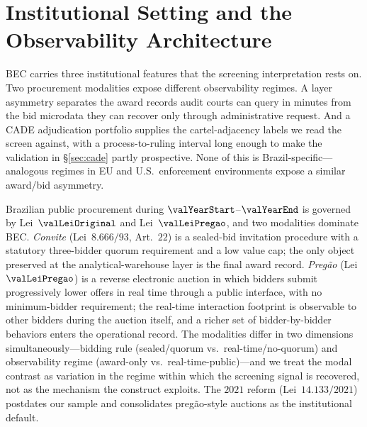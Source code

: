 \section{Institutional Setting and the Observability Architecture}
\label{sec:institutional}

BEC carries three institutional features that the screening
interpretation rests on. Two procurement modalities expose
different observability regimes. A layer asymmetry separates
the award records audit courts can query in minutes from the
bid microdata they can recover only through administrative
request. And a CADE adjudication portfolio supplies the
cartel-adjacency labels we read the screen against, with a
process-to-ruling interval long enough to make the validation
in \S\ref{sec:cade} partly prospective. None of this is
Brazil-specific---analogous regimes in EU and U.S.\ enforcement
environments expose a similar award/bid asymmetry.

Brazilian public procurement during $\valYearStart$--$\valYearEnd$
is governed by Lei~$\valLeiOriginal$ and Lei~$\valLeiPregao$,
and two modalities dominate BEC. \emph{Convite}
(Lei~$8.666/93$, Art.~$22$) is a sealed-bid invitation procedure
with a statutory three-bidder quorum requirement and a low value
cap; the only object preserved at the analytical-warehouse layer
is the final award record. \emph{Preg\~ao}
(Lei~$\valLeiPregao$) is a reverse electronic auction in which
bidders submit progressively lower offers in real time through a
public interface, with no minimum-bidder requirement; the
real-time interaction footprint is observable to other bidders
during the auction itself, and a richer set of bidder-by-bidder
behaviors enters the operational record. The modalities differ
in two dimensions simultaneously---bidding rule (sealed/quorum
vs.\ real-time/no-quorum) and observability regime (award-only
vs.\ real-time-public)---and we treat the modal contrast as
variation in the regime within which the screening signal is
recovered, not as the mechanism the construct exploits. The
$2021$ reform (Lei~$14.133/2021$) postdates our sample and
consolidates preg\~ao-style auctions as the institutional
default.

